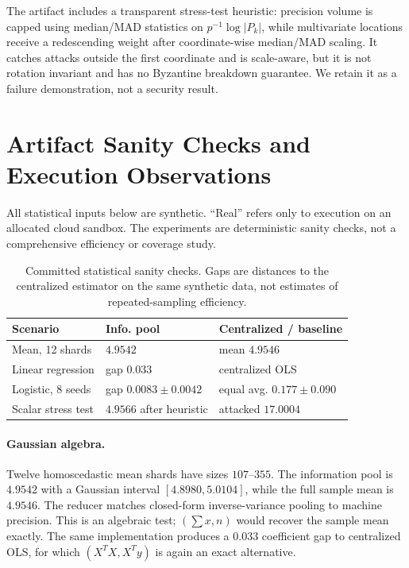 The artifact includes a transparent stress-test heuristic: precision volume is capped using median/MAD statistics on $p^{-1}\log|P_k|$, while multivariate locations receive a redescending weight after coordinate-wise median/MAD scaling. It catches attacks outside the first coordinate and is scale-aware, but it is not rotation invariant and has no Byzantine breakdown guarantee. We retain it as a failure demonstration, not a security result.

\section{Artifact Sanity Checks and Execution Observations}
\label{sec:eval}

All statistical inputs below are synthetic. ``Real'' refers only to execution on an allocated cloud sandbox. The experiments are deterministic sanity checks, not a comprehensive efficiency or coverage study.

\begin{table}[t]
\centering\footnotesize
\caption{Committed statistical sanity checks. Gaps are distances to the centralized estimator on the same synthetic data, not estimates of repeated-sampling efficiency.}
\label{tab:stats}
\begin{tabularx}{\columnwidth}{@{}>{\raggedright\arraybackslash}p{}>{\raggedleft\arraybackslash}X>{\raggedleft\arraybackslash}p{}@{}}
\toprule
Scenario & Info. pool & Centralized / baseline \\
\midrule
Mean, 12 shards & $4.9542$ & mean $4.9546$ \\
Linear regression & gap $0.033$ & centralized OLS \\
Logistic, 8 seeds & gap $0.0083\pm0.0042$ & equal avg. $0.177\pm0.090$ \\
Scalar stress test & $4.9566$ after heuristic & attacked $17.0004$ \\
\bottomrule
\end{tabularx}
\end{table}

\paragraph{Gaussian algebra.} Twelve homoscedastic mean shards have sizes $107$--$355$. The information pool is $4.9542$ with a Gaussian interval $[4.8980,5.0104]$, while the full sample mean is $4.9546$. The reducer matches closed-form inverse-variance pooling to machine precision. This is an algebraic test; $(\sum x,n)$ would recover the sample mean exactly. The same implementation produces a $0.033$ coefficient gap to centralized OLS, for which $(X^TX,X^Ty)$ is again an exact alternative.

